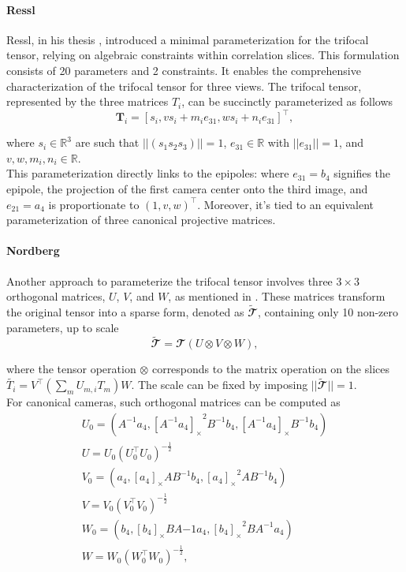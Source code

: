 \paragraph{Ressl}
Ressl, in his thesis \cite{9-ressl-param}, introduced a minimal parameterization for the trifocal tensor, relying on algebraic constraints within correlation slices. This formulation consists of 20 parameters and 2 constraints. It enables the comprehensive characterization of the trifocal tensor for three views. The trifocal tensor, represented by the three matrices \( T_i \), can be succinctly parameterized as follows
\begin{equation}
	\bm{T}_i = [s_i, vs_i + m_ie_{31}, ws_i + n_ie_{31}]^\top,
\end{equation}

where \( s_i \in \mathbb{R}^3 \) are such that \( || (s_1 s_2 s_3) || = 1 \), \( e_{31} \in \mathbb{R} \) with \( || e_{31} || = 1 \), and \( v, w, m_i, n_i \in \mathbb{R} \).\\

This parameterization directly links to the epipoles: where \( e_{31} = b_4 \) signifies the epipole, the projection of the first camera center onto the third image, and \( e_{21} = a_4 \) is proportionate to \( (1,v,w)^\top \). Moreover, it's tied to an equivalent parameterization of three canonical projective matrices.

\paragraph{Nordberg}
Another approach to parameterize the trifocal tensor involves three \( 3 \times 3 \) orthogonal matrices, \( U \), \( V \), and \( W \), as mentioned in \cite{6-nordberg-param}. These matrices transform the original tensor into a sparse form, denoted as \( \bm{\widetilde{\mathbfcal{T}}} \), containing only 10 non-zero parameters, up to scale
\begin{equation}
	\bm{\widetilde{\mathbfcal{T}}} = \mathbfcal{T} (U \otimes V \otimes W),
\end{equation}

where the tensor operation \( \otimes \) corresponds to the matrix operation on the slices \( \widetilde{T_i} = V^\top (\sum_{m}U_{m,i}T_m) W \). The scale can be fixed by imposing \( || \bm{\widetilde{\mathbfcal{T}}} || = 1 \).\\

For canonical cameras, such orthogonal matrices can be computed as
\begin{equation}
	\begin{gathered}
		U_0 = (A^{-1}a_4, {[A^{-1}a_4]_{\times}}^2B^{-1}b_4, [A^{-1}a_4]_{\times}B^{-1}b_4)\\
		U = U_0(U_0^\top U_0)^{-\frac{1}{2}}\\
		V_0 = (a_4, [a_4]_{\times}AB^{-1}b_4, {[a_4]_{\times}}^2AB^{-1}b_4)\\
		V = V_0(V_0^\top V_0)^{-\frac{1}{2}}\\
		W_0 = (b_4, [b_4]_{\times}BA{-1}a_4, {[b_4]_{\times}}^2BA^{-1}a_4)\\
		W = W_0(W_0^\top W_0)^{-\frac{1}{2}},
	\end{gathered}
\end{equation}

